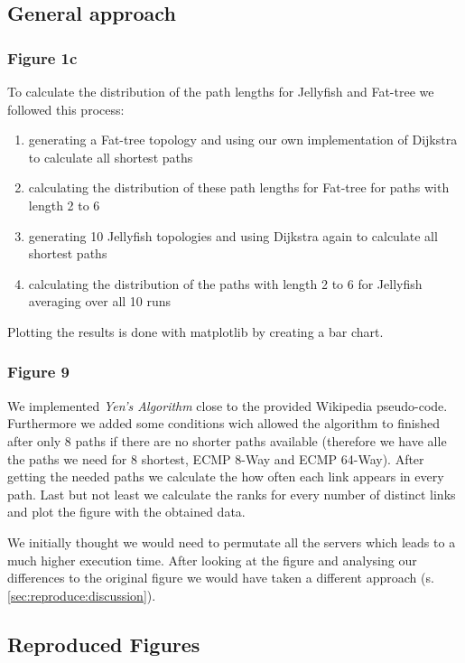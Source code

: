 \documentclass[a4paper,11pt]{article}
\begin{document}
\subsection{General approach}

\subsubsection{Figure 1c}

To calculate the distribution of the path lengths for Jellyfish and Fat-tree we followed this process:
\begin{enumerate}
    \item generating a Fat-tree topology and using our own implementation of Dijkstra to calculate all shortest paths
    \item calculating the distribution of these path lengths for Fat-tree for paths with length 2 to 6
    \item generating 10 Jellyfish topologies and using Dijkstra again to calculate all shortest paths
    \item calculating the distribution of the paths with length 2 to 6 for Jellyfish averaging over all 10 runs
\end{enumerate}

Plotting the results is done with matplotlib by creating a bar chart.


\subsubsection{Figure 9}

We implemented \textit{Yen's Algorithm} close to the provided Wikipedia pseudo-code.
Furthermore we added some conditions wich allowed the algorithm to finished after only 8 paths if there are no shorter paths available (therefore we have alle the paths we need for 8 shortest, ECMP 8-Way and ECMP 64-Way).
After getting the needed paths we calculate the how often each link appears in every path.
Last but not least we calculate the ranks for every number of distinct links and plot the figure with the obtained data.

We initially thought we would need to permutate all the servers which leads to a much higher execution time.
After looking at the figure and analysing our differences to the original figure we would have taken a different approach (s. \autoref{sec:reproduce:discussion}).

\subsection{Reproduced Figures}
\end{document}
